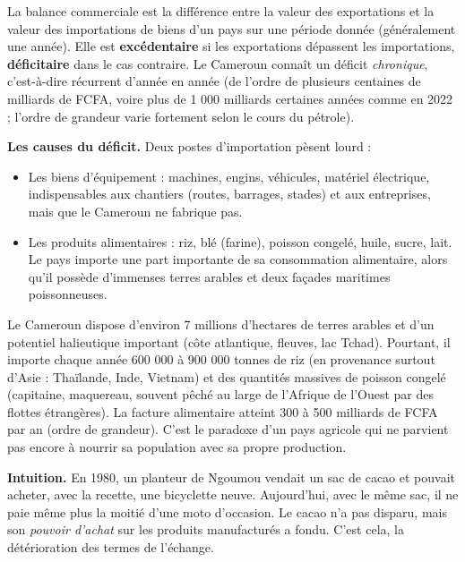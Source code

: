 \documentclass[11pt]{article}
\newcommand{\cle}[1]{{\popxbold\color{popdark}#1}}
\newcounter{popsec}
\newcounter{popsub}
\newcommand{\courssub}[1]{%
  \stepcounter{popsub}%
  \par\vspace{9pt}\noindent{\popxbold\fontsize{11.5}{13}\selectfont\color{popink}{\color{poporange}\thepopsec.\thepopsub}\hspace{6pt}#1}\par\nopagebreak\vspace{4pt}
}
\begin{document}
\begin{definition}
La \cle{balance commerciale} est la différence entre la valeur des exportations et la valeur des importations de biens d'un pays sur une période donnée (généralement une année). Elle est \textbf{excédentaire} si les exportations dépassent les importations, \textbf{déficitaire} dans le cas contraire. Le Cameroun connaît un déficit \emph{chronique}, c'est-à-dire récurrent d'année en année (de l'ordre de plusieurs centaines de milliards de FCFA, voire plus de 1 000 milliards certaines années comme en 2022 ; l'ordre de grandeur varie fortement selon le cours du pétrole).
\end{definition}

\textbf{Les causes du déficit.} Deux postes d'importation pèsent lourd :

\begin{itemize}
\item Les \cle{biens d'équipement} : machines, engins, véhicules, matériel électrique, indispensables aux chantiers (routes, barrages, stades) et aux entreprises, mais que le Cameroun ne fabrique pas.
\item Les \cle{produits alimentaires} : riz, blé (farine), poisson congelé, huile, sucre, lait. Le pays importe une part importante de sa consommation alimentaire, alors qu'il possède d'immenses terres arables et deux façades maritimes poissonneuses.
\end{itemize}

\begin{savaistu}
Le Cameroun dispose d'environ 7 millions d'hectares de terres arables et d'un potentiel halieutique important (côte atlantique, fleuves, lac Tchad). Pourtant, il importe chaque année 600 000 à 900 000 tonnes de riz (en provenance surtout d'Asie : Thaïlande, Inde, Vietnam) et des quantités massives de poisson congelé (capitaine, maquereau, souvent pêché au large de l'Afrique de l'Ouest par des flottes étrangères). La facture alimentaire atteint 300 à 500 milliards de FCFA par an (ordre de grandeur). C'est le paradoxe d'un pays agricole qui ne parvient pas encore à nourrir sa population avec sa propre production.
\end{savaistu}

\courssub{La détérioration des termes de l'échange}

\textbf{Intuition.} En 1980, un planteur de Ngoumou vendait un sac de cacao et pouvait acheter, avec la recette, une bicyclette neuve. Aujourd'hui, avec le même sac, il ne paie même plus la moitié d'une moto d'occasion. Le cacao n'a pas disparu, mais son \emph{pouvoir d'achat} sur les produits manufacturés a fondu. C'est cela, la détérioration des termes de l'échange.
\end{document}
